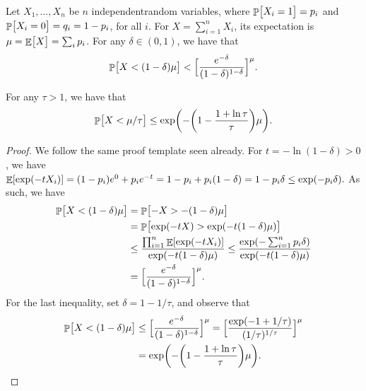 \begin{theorem}
    Let $X_1, \ldots, X_n$ be $n$ independent\newline random variables,
    where $\Prob{ \bigl. X_i = 1 } =p_i$ and
    $\Prob{ \bigl. X_i = 0 } =q_i = 1-p_i$, for all $i$.  For
    $X = \sum_{i=1}^{n} X_i$, its expectation is
    $\mu = \mathop{\mathbb{E}}\!\left[ {\bigl. X} \right] = \sum_i p_i$.  For any $\delta \in (0,1)$, we have
    that%
    \begin{equation*}
         \Prob{\bigl. X < (1-\delta)\mu } <
         \Bigl[  \frac{e^{-\delta}}{(1-\delta)^{1-\delta}} \Bigr]^\mu.
     \end{equation*}

    For any $\tau > 1$, we have that
    \[
      \Prob{ X < \mu/\tau \bigr.} %
      \leq%
      \exp\pth{-\pth{1 - \frac{1 + \ln \tau}{\tau}} \mu}.
    \]
\end{theorem}


\begin{proof}
    We follow the same proof template seen already. For
    $t = - \ln( 1-\delta ) > 0$, we have
    \begin{math}
        \Ex{\exp( -t X_i)}%
        =%
        (1-p_i) e^0 + p_i e^{-t}%
        =%
        1-p_i + p_i ( 1-\delta)%
        =%
        1 - p_i\delta%
        \leq%
        \exp \pth{ -p_i \delta}.
    \end{math}
    As such, we have
    \begin{align*}
      \Prob{ X < (1-\delta)\mu \bigr.} %
      &=%
        \Prob{ -X > -(1-\delta)\mu \bigr.} \\
      &= %
        \Prob{ \exp( -t X)  > \exp\pth{-t(1-\delta)\mu} \bigr.} \\
      &\leq %
        \frac{\prod_{i=1}^n \Ex{\exp( -t X_i)}}{\exp\pth{-t(1-\delta)\mu}}%
        \leq%
        \frac{\exp\pth{-\sum_{i=1}^n  p_i\delta}}
        {\exp\pth{-t(1-\delta)\mu}}  \\
      &=%
        \Bigl[  \frac{e^{-\delta}}{(1-\delta)^{1-\delta}} \Bigr]^\mu.
    \end{align*}
    For the last inequality, set $\delta = 1-1/\tau$, and observe that
    \begin{align*}
      \Prob{ X < (1-\delta)\mu \bigr.} %
      &\leq%
        \Bigl[  \frac{e^{-\delta}}{(1-\delta)^{1-\delta}} \Bigr]^\mu
        =%
        \Bigl[  \frac{\exp\pth{-1 + 1/\tau}}
        {(1/\tau)^{1/\tau}} \Bigr]^\mu \\
      &=%
        \exp\pth{-\pth{1 - \frac{1 + \ln \tau}{\tau}} \mu}.
    \end{align*}
\end{proof}

